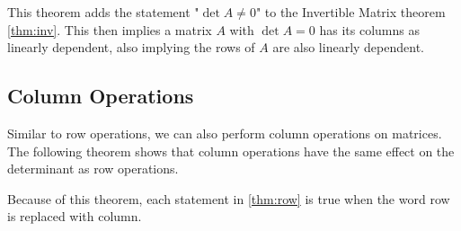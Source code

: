 \documentclass[12pt letter]{report}
\begin{document}

This theorem adds the statement "$\det A \neq 0$" to the Invertible Matrix theorem \ref{thm:inv}. This then implies a
matrix $A$ with $\det A = 0$ has its columns as linearly dependent, also implying the rows of $A$ are also linearly
dependent.

\subsection{Column Operations}

Similar to row operations, we can also perform column operations on matrices. The following theorem shows that column
operations have the same effect on the determinant as row operations.


Because of this theorem, each statement in \ref{thm:row} is true when the word row is replaced with column.
\end{document}
